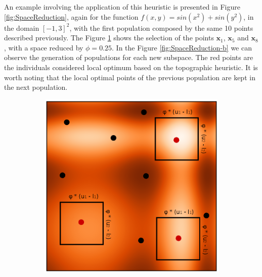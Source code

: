 An example involving the application of this heuristic is presented in Figure \ref{fig:SpaceReduction}, again for the function $f(x, y) = sin(x^2) + sin(y^2)$, in the domain $[-1, 3]^2$, with the first population composed by the same 10 points described previously. The Figure \ref{fig:SpaceReduction-a} shows the selection of the points $\bm{x}_1$, $\bm{x}_5$ and $\bm{x}_8$, with a space reduced by $\phi = 0.25$. In the Figure \ref{fig:SpaceReduction-b} we can observe the generation of populations for each new subspace. The red points are the individuals considered local optimum based on the topographic heuristic. It is worth noting that the local optimal points of the previous population are kept in the next population.


\begin{figure}[tp]
\centering
\begin{subfigure}{.5\textwidth}
  \centering
  \includegraphics[width=1.1\linewidth]{fig_2.eps}
  \caption{}
  \label{fig:SpaceReduction-a}
\end{subfigure}%
\begin{subfigure}{.5\textwidth}
  \centering

\end{subfigure}
\end{figure}
